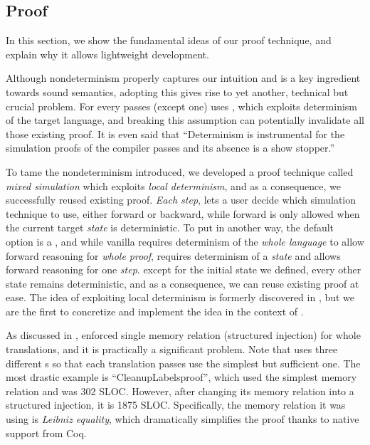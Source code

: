 {\subsection{Proof}\label{sec:overview:proof}

In this section, we show the fundamental ideas of our proof technique, and explain why it allows lightweight development.

Although nondeterminism properly captures our intuition and is a key ingredient towards sound semantics, adopting this gives rise to yet another, technical but crucial problem.
For every passes (except one) \cc{} uses \fsim{}, which exploits determinism of the target language, and breaking this assumption can potentially invalidate all those existing proof.
It is even said that ``Determinism is instrumental for the simulation proofs of the compiler passes and its absence is a show stopper.'' \cite{besson:intptr}


To tame the nondeterminism introduced, we developed a proof technique called \textit{mixed simulation} which exploits \textit{local determinism}, and as a consequence, we successfully reused existing proof.
\textit{Each step}, \xsim{} lets a user decide which simulation technique to use, either forward or backward, while forward is only allowed when the current target \textit{state} is deterministic.
To put in another way, the default option is a \bsim{}, and while vanilla \fsim{} requires determinism of the \textit{whole language} to allow forward reasoning for \textit{whole proof}, \xsim{} requires determinism of a \textit{state} and allows forward reasoning for one \textit{step}.
\nb{} except for the initial state we defined, every other state remains deterministic, and as a consequence, we can reuse existing proof at ease.
The idea of exploiting local determinism is formerly discovered in \cite{neis:pilsner}, but we are the first to concretize and implement the idea in the context of \cc{}. 



As discussed in , \ccc{} enforced single memory relation (structured injection) for whole translations, and it is practically a significant problem. %
Note that \cc{} uses three different \mrel{}s so that each translation passes use the simplest but sufficient one.
The most drastic example is ``CleanupLabelsproof'', which used the simplest memory relation and was 302 SLOC.
However, after changing its memory relation into a structured injection, it is 1875 SLOC.
Specifically, the memory relation it was using is \textit{Leibniz equality}, which dramatically simplifies the proof thanks to native support from Coq.

}
